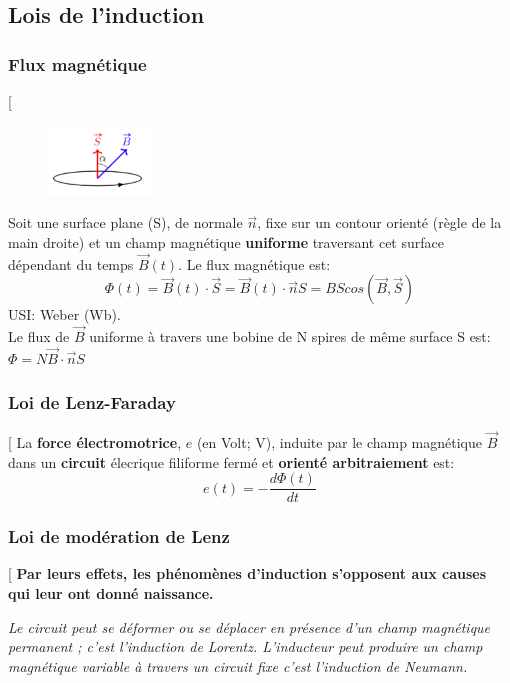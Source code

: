 \documentclass[12pt,hidelinks]{article}
\begin{document}
    \subsection{Lois de l'induction}
        \subsubsection{Flux magnétique}
        \begin{DashedDefinition}{}[
        \begin{figure}
            \centering
            \includegraphics[width=0.25\textwidth]{Figures/Induction1.png}
        \end{figure}
        Soit une surface plane (S), de normale $\vec n$, fixe sur un contour orienté (règle de la main droite) et un champ magnétique \textbf{uniforme} traversant cet surface dépendant du temps $\vec B(t)$. Le flux magnétique est:
        \[\Phi (t) = \vec B(t) \cdot \vec S = \vec B(t) \cdot \vec n S=BScos(\vec B, \vec S)\]
        USI: Weber (Wb). \\
        Le flux de $\vec B$ uniforme à travers une bobine de N spires de même surface S est: $\Phi = N \vec B \cdot \vec n S$
        \end{DashedDefinition}

        \subsubsection{Loi de Lenz-Faraday}
        \begin{DashedDefinition}{}[
            La \textbf{force électromotrice}, $e$ (en Volt; V), induite par le champ magnétique $\vec B$ dans un \textbf{circuit} élecrique filiforme fermé et \textbf{orienté arbitraiement} est:
            \[e(t)=- \frac{d \Phi(t)}{dt}\]
        \end{DashedDefinition}

        \subsubsection{Loi de modération de Lenz}
        \begin{DashedDefinition}{}[
        \textbf{Par leurs effets, les phénomènes d'induction s'opposent aux causes qui leur ont donné naissance.}
        \end{DashedDefinition}
        \textit{Le circuit peut se déformer ou se déplacer en présence d'un champ magnétique permanent ; c'est l'induction de Lorentz. L'inducteur peut produire un champ magnétique variable à travers un circuit fixe c'est l'induction de Neumann.}
\end{document}
